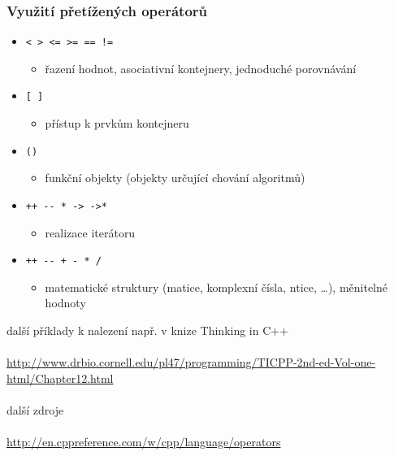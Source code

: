 \begin{frame}[fragile]
\frametitle{Využití přetížených operátorů}
\begin{block}{}
\begin{itemize}
\item \lstinline|< > <= >= == !=|
\begin{itemize}
\item řazení hodnot, asociativní kontejnery, jednoduché porovnávání
\end{itemize}

\item \lstinline|[ ]|
\begin{itemize}
\item přístup k prvkům kontejneru
\end{itemize}

\item \lstinline|()|
\begin{itemize}
\item funkční objekty (objekty určující chování algoritmů)
\end{itemize}

\item \lstinline|++ -- * -> ->*|
\begin{itemize}
\item realizace iterátoru
\end{itemize}

\item \lstinline|++ -- + - * /|
\begin{itemize}
\item matematické struktury (matice, komplexní čísla, ntice, \ldots), měnitelné hodnoty
\end{itemize}


\end{itemize}
\end{block}
\end{frame}






\begin{frame}[fragile]
\begin{center}
další příklady k nalezení např. v knize Thinking in C++ \\ ~ \\
\url{http://www.drbio.cornell.edu/pl47/programming/TICPP-2nd-ed-Vol-one-html/Chapter12.html} \\
~ \\
další zdroje \\
~ \\
\url{http://en.cppreference.com/w/cpp/language/operators} \\
~ \\
\end{center}
\end{frame}







\zkouskove